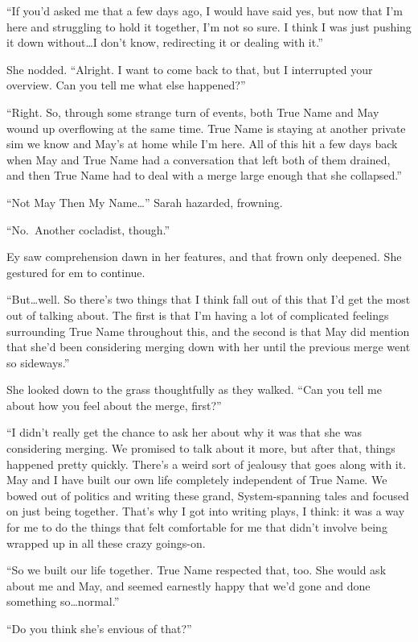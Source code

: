 ``If you'd asked me that a few days ago, I would have said yes, but now that I'm here and struggling to hold it together, I'm not so sure. I think I was just pushing it down without\ldots I don't know, redirecting it or dealing with it.''

She nodded. ``Alright. I want to come back to that, but I interrupted your overview. Can you tell me what else happened?''

``Right. So, through some strange turn of events, both True Name and May wound up overflowing at the same time. True Name is staying at another private sim we know and May's at home while I'm here. All of this hit a few days back when May and True Name had a conversation that left both of them drained, and then True Name had to deal with a merge large enough that she collapsed.''

``Not May Then My Name\ldots{}'' Sarah hazarded, frowning.

``No.~Another cocladist, though.''

Ey saw comprehension dawn in her features, and that frown only deepened. She gestured for em to continue.

``But\ldots well. So there's two things that I think fall out of this that I'd get the most out of talking about. The first is that I'm having a lot of complicated feelings surrounding True Name throughout this, and the second is that May did mention that she'd been considering merging down with her until the previous merge went so sideways.''

She looked down to the grass thoughtfully as they walked. ``Can you tell me about how you feel about the merge, first?''

``I didn't really get the chance to ask her about why it was that she was considering merging. We promised to talk about it more, but after that, things happened pretty quickly. There's a weird sort of jealousy that goes along with it. May and I have built our own life completely independent of True Name. We bowed out of politics and writing these grand, System-spanning tales and focused on just being together. That's why I got into writing plays, I think: it was a way for me to do the things that felt comfortable for me that didn't involve being wrapped up in all these crazy goings-on.

``So we built our life together. True Name respected that, too. She would ask about me and May, and seemed earnestly happy that we'd gone and done something so\ldots normal.''

``Do you think she's envious of that?''

